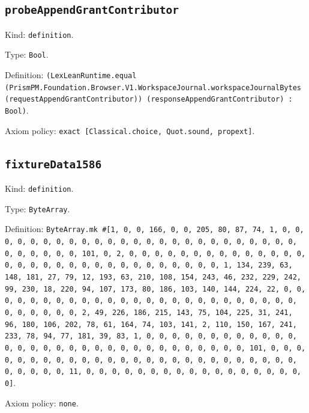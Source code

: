 \documentclass[11pt]{article}
\begin{document}
\subsection*{\texttt{probeAppendGrantContributor}}
\noindent Kind: \texttt{definition}.\par
\noindent Type: \texttt{Bool}.\par
\noindent Definition: \texttt{(LexLeanRuntime.equal (PrismPM.Foundation.Browser.V1.WorkspaceJournal.workspaceJournalBytes (requestAppendGrantContributor)) (responseAppendGrantContributor) : Bool)}.\par
\noindent Axiom policy: \texttt{exact [Classical.choice, Quot.sound, propext]}.\par
\subsection*{\texttt{fixtureData1586}}
\noindent Kind: \texttt{definition}.\par
\noindent Type: \texttt{ByteArray}.\par
\noindent Definition: \texttt{ByteArray.mk \#[1, 0, 0, 166, 0, 0, 205, 80, 87, 74, 1, 0, 0, 0, 0, 0, 0, 0, 0, 0, 0, 0, 0, 0, 0, 0, 0, 0, 0, 0, 0, 0, 0, 0, 0, 0, 0, 0, 0, 0, 0, 0, 101, 0, 2, 0, 0, 0, 0, 0, 0, 0, 0, 0, 0, 0, 0, 0, 0, 0, 0, 0, 0, 0, 0, 0, 0, 0, 0, 0, 0, 0, 0, 0, 0, 0, 1, 134, 239, 63, 148, 181, 27, 79, 12, 193, 63, 210, 108, 154, 243, 46, 232, 229, 242, 99, 230, 18, 220, 94, 107, 173, 80, 186, 103, 140, 144, 224, 22, 0, 0, 0, 0, 0, 0, 0, 0, 0, 0, 0, 0, 0, 0, 0, 0, 0, 0, 0, 0, 0, 0, 0, 0, 0, 0, 0, 0, 0, 0, 0, 2, 49, 226, 186, 215, 143, 75, 104, 225, 31, 241, 96, 180, 106, 202, 78, 61, 164, 74, 103, 141, 2, 110, 150, 167, 241, 233, 78, 94, 77, 181, 39, 83, 1, 0, 0, 0, 0, 0, 0, 0, 0, 0, 0, 0, 0, 0, 0, 0, 0, 0, 0, 0, 0, 0, 0, 0, 0, 0, 0, 0, 0, 0, 0, 0, 101, 0, 0, 0, 0, 0, 0, 0, 0, 0, 0, 0, 0, 0, 0, 0, 0, 0, 0, 0, 0, 0, 0, 0, 0, 0, 0, 0, 0, 0, 0, 0, 11, 0, 0, 0, 0, 0, 0, 0, 0, 0, 0, 0, 0, 0, 0, 0, 0, 0, 0]}.\par
\noindent Axiom policy: \texttt{none}.\par
\end{document}
